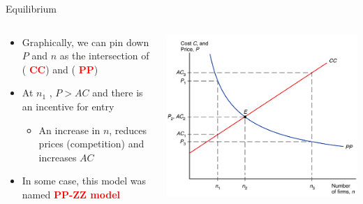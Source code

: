 \documentclass[10pt,hyperref={CJKbookmarks=true},xcolor=dvipsnames,aspectratio=169]{beamer}
\begin{document}
\begin{frame}{Equilibrium }


\begin{columns}[onlytextwidth]
\begin{column}{0.5\textwidth}
\begin{itemize}
\item Graphically, we can pin down $P$ and $n$ as the intersection of
( \textbf{\textcolor{red}{CC}}) and ( \textbf{\textcolor{red}{PP}}) 
\item At $n_{1}$ , $P>AC$ and there is an incentive for entry 

\begin{itemize}
\item An increase in $n$, reduces prices (competition) and increases $AC$ 
\end{itemize}
\item In some case, this model was named \textbf{\textcolor{red}{PP-ZZ model}}
\end{itemize}

\end{column}
\begin{column}{0.5\textwidth}
\includegraphics[width=\columnwidth]{fig/krugman/lec6-15}
\end{column}
\end{columns}


\end{frame}
\end{document}
